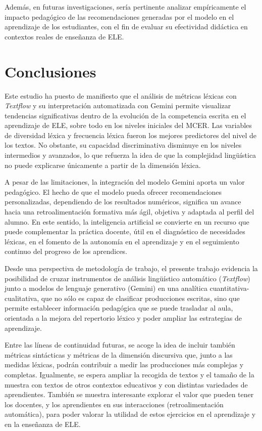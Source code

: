\documentclass[spanish]{textolivre}
\begin{document}
Además, en futuras investigaciones, sería pertinente analizar empíricamente el impacto pedagógico de las recomendaciones generadas por el modelo en el aprendizaje de los estudiantes, con el fin de evaluar su efectividad didáctica en contextos reales de enseñanza de ELE.


\section{Conclusiones}

Este estudio ha puesto de manifiesto que el análisis de métricas léxicas con \textit{Textflow} y su interpretación automatizada con Gemini permite visualizar tendencias significativas dentro de la evolución de la competencia escrita en el aprendizaje de ELE, sobre todo en los niveles iniciales del MCER. Las variables de diversidad léxica y frecuencia léxica fueron los mejores predictores del nivel de los textos. No obstante, su capacidad discriminativa disminuye en los niveles intermedios y avanzados, lo que refuerza la idea de que la complejidad lingüística no puede explicarse únicamente a partir de la dimensión léxica.

A pesar de las limitaciones, la integración del modelo Gemini aporta un valor pedagógico. El hecho de que el modelo pueda ofrecer recomendaciones personalizadas, dependiendo de los resultados numéricos, significa un avance hacia una retroalimentación formativa más ágil, objetiva y adaptada al perfil del alumno. En este sentido, la inteligencia artificial se convierte en un recurso que puede complementar la práctica docente, útil en el diagnóstico de necesidades léxicas, en el fomento de la autonomía en el aprendizaje y en el seguimiento continuo del progreso de los aprendices.

Desde una perspectiva de metodología de trabajo, el presente trabajo evidencia la posibilidad de cruzar instrumentos de análisis lingüístico automático (\textit{Textflow}) junto a modelos de lenguaje generativo (Gemini) en una analítica cuantitativa-cualitativa, que no sólo es capaz de clasificar producciones escritas, sino que permite establecer información pedagógica que se puede trasladar al aula, orientada a la mejora del repertorio léxico y poder ampliar las estrategias de aprendizaje.

Entre las líneas de continuidad futuras, se acoge la idea de incluir también métricas sintácticas y métricas de la dimensión discursiva que, junto a las medidas léxicas, podrán contribuir a medir las producciones más complejas y completas. Igualmente, se espera ampliar la recogida de textos y el tamaño de la muestra con textos de otros contextos educativos y con distintas variedades de aprendientes. También se muestra interesante explorar el valor que pueden tener los docentes, y los aprendientes en sus interacciones (retroalimentación automática), para poder valorar la utilidad de estos ejercicios en el aprendizaje y en la enseñanza de ELE.
\end{document}
